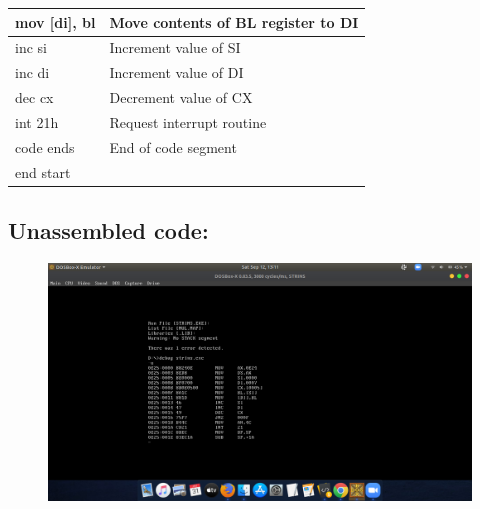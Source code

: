 \documentclass[12pt,a4paper]{article}
\begin{document}
\begin{flushleft}
\begin{table}[htb]
{\begin{tabular}{|l|l|}
\hline
mov [di], bl                                                     & Move contents of BL register to DI            \\
\hline
inc si                                                           & Increment value of SI                         \\
\hline
inc di                                                           & Increment value of DI                         \\
\hline
dec cx                                                           & Decrement value of CX                         \\
\hline
int 21h                                                          & Request interrupt routine                     \\ 
\hline
code ends                                                        & End of code segment                           \\
\hline
end start                                                        &                                               \\
\hline
\end{tabular}
}
\end{table}

\newpage
\subsection*{\textbf{Unassembled code:}}
\begin{figure}[h]
    \centering
    \includegraphics[trim = 100mm 60mm 200mm 120mm, clip, width = \textwidth]{Pics/StrinsUS.png}
\end{figure}

\end{flushleft}
\end{document}
